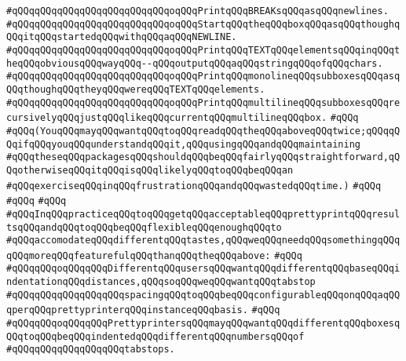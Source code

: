 \verb|#qQQqqQQqqQQqqQQqqQQqqQQqqQQqoqQQqPrintqQQqBREAKsqQQqasqQQqnewlines.|\newline
\verb|#qQQqqQQqqQQqqQQqqQQqqQQqqQQqoqQQqStartqQQqtheqQQqboxqQQqasqQQqthoughqQQqitqQQqstartedqQQqwithqQQqaqQQqNEWLINE.|\newline
\verb|#qQQqqQQqqQQqqQQqqQQqqQQqqQQqoqQQqPrintqQQqTEXTqQQqelementsqQQqinqQQqtheqQQqobviousqQQqwayqQQq--qQQqoutputqQQqaqQQqstringqQQqofqQQqchars.|\newline
\verb|#qQQqqQQqqQQqqQQqqQQqqQQqqQQqoqQQqPrintqQQqmonolineqQQqsubboxesqQQqasqQQqthoughqQQqtheyqQQqwereqQQqTEXTqQQqelements.|\newline
\verb|#qQQqqQQqqQQqqQQqqQQqqQQqqQQqoqQQqPrintqQQqmultilineqQQqsubboxesqQQqrecursivelyqQQqjustqQQqlikeqQQqcurrentqQQqmultilineqQQqbox.|\newline
\verb|#qQQq|\newline
\verb|#qQQq(YouqQQqmayqQQqwantqQQqtoqQQqreadqQQqtheqQQqaboveqQQqtwice;qQQqqQQqifqQQqyouqQQqunderstandqQQqit,qQQqusingqQQqandqQQqmaintaining|\newline
\verb|#qQQqtheseqQQqpackagesqQQqshouldqQQqbeqQQqfairlyqQQqstraightforward,qQQqotherwiseqQQqitqQQqisqQQqlikelyqQQqtoqQQqbeqQQqan|\newline
\verb|#qQQqexerciseqQQqinqQQqfrustrationqQQqandqQQqwastedqQQqtime.)|\newline
\verb|#qQQq|\newline
\verb|#qQQq|\newline
\verb|#qQQq|\newline
\verb|#qQQqInqQQqpracticeqQQqtoqQQqgetqQQqacceptableqQQqprettyprintqQQqresultsqQQqandqQQqtoqQQqbeqQQqflexibleqQQqenoughqQQqto|\newline
\verb|#qQQqaccomodateqQQqdifferentqQQqtastes,qQQqweqQQqneedqQQqsomethingqQQqqQQqmoreqQQqfeaturefulqQQqthanqQQqtheqQQqabove:|\newline
\verb|#qQQq|\newline
\verb|#qQQqqQQqoqQQqqQQqDifferentqQQqusersqQQqwantqQQqdifferentqQQqbaseqQQqindentationqQQqdistances,qQQqsoqQQqweqQQqwantqQQqtabstop|\newline
\verb|#qQQqqQQqqQQqqQQqqQQqspacingqQQqtoqQQqbeqQQqconfigurableqQQqonqQQqaqQQqperqQQqprettyprinterqQQqinstanceqQQqbasis.|\newline
\verb|#qQQq|\newline
\verb|#qQQqqQQqoqQQqqQQqPrettyprintersqQQqmayqQQqwantqQQqdifferentqQQqboxesqQQqtoqQQqbeqQQqindentedqQQqdifferentqQQqnumbersqQQqof|\newline
\verb|#qQQqqQQqqQQqqQQqqQQqtabstops.|\newline
